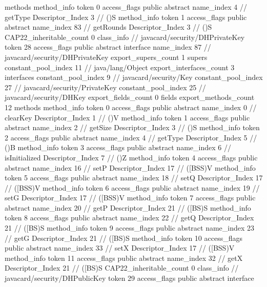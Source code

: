 {{{			methods {
				method_info {
					token	0
					access_flags	public abstract
					name_index	4		// getType
					Descriptor_Index	3		// ()S
				}
				method_info {
					token	1
					access_flags	public abstract
					name_index	83		// getRounds
					Descriptor_Index	3		// ()S
				}
			}
			CAP22_inheritable_count	0
		}
		class_info {		// javacard/security/DHPrivateKey
			token	28
			access_flags	public abstract interface
			name_index	87		// javacard/security/DHPrivateKey
			export_supers_count	1
			supers {
				constant_pool_index	11		// java/lang/Object
			}
			export_interfaces_count	3
			interfaces {
				constant_pool_index	9		// javacard/security/Key
				constant_pool_index	27		// javacard/security/PrivateKey
				constant_pool_index	25		// javacard/security/DHKey
			}
			export_fields_count	0
			fields {
			}
			export_methods_count	12
			methods {
				method_info {
					token	0
					access_flags	public abstract
					name_index	0		// clearKey
					Descriptor_Index	1		// ()V
				}
				method_info {
					token	1
					access_flags	public abstract
					name_index	2		// getSize
					Descriptor_Index	3		// ()S
				}
				method_info {
					token	2
					access_flags	public abstract
					name_index	4		// getType
					Descriptor_Index	5		// ()B
				}
				method_info {
					token	3
					access_flags	public abstract
					name_index	6		// isInitialized
					Descriptor_Index	7		// ()Z
				}
				method_info {
					token	4
					access_flags	public abstract
					name_index	16		// setP
					Descriptor_Index	17		// ([BSS)V
				}
				method_info {
					token	5
					access_flags	public abstract
					name_index	18		// setQ
					Descriptor_Index	17		// ([BSS)V
				}
				method_info {
					token	6
					access_flags	public abstract
					name_index	19		// setG
					Descriptor_Index	17		// ([BSS)V
				}
				method_info {
					token	7
					access_flags	public abstract
					name_index	20		// getP
					Descriptor_Index	21		// ([BS)S
				}
				method_info {
					token	8
					access_flags	public abstract
					name_index	22		// getQ
					Descriptor_Index	21		// ([BS)S
				}
				method_info {
					token	9
					access_flags	public abstract
					name_index	23		// getG
					Descriptor_Index	21		// ([BS)S
				}
				method_info {
					token	10
					access_flags	public abstract
					name_index	33		// setX
					Descriptor_Index	17		// ([BSS)V
				}
				method_info {
					token	11
					access_flags	public abstract
					name_index	32		// getX
					Descriptor_Index	21		// ([BS)S
				}
			}
			CAP22_inheritable_count	0
		}
		class_info {		// javacard/security/DHPublicKey
			token	29
			access_flags	public abstract interface
}}}
